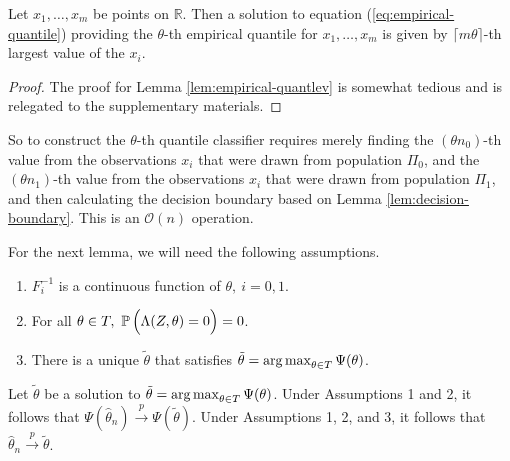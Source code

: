 \begin{lemma}
  \label{lem:empirical-quantlev}
  Let $x_1, \dots, x_m$ be points on $\mathbb{R}$.  Then a solution to equation
  (\ref{eq:empirical-quantile}) providing the $\theta$-th empirical quantile for
  $x_1, \dots, x_m$ is given by $\lceil m \theta \rceil$-th largest value of the
  $x_i$.
\end{lemma}

\begin{proof}
  The proof for Lemma \ref{lem:empirical-quantlev} is somewhat tedious and is
  relegated to the supplementary materials.
\end{proof}
So to construct the $\theta$-th quantile classifier requires merely finding the
$(\theta n_0)$-th value from the observations $x_i$ that were drawn from
population $\Pi_0$, and the $(\theta n_1)$-th value from the observations $x_i$
that were drawn from population $\Pi_1$, and then calculating the decision
boundary based on Lemma \ref{lem:decision-boundary}.  This is an
$\mathcal{O}(n)$ operation.

For the next lemma, we will need the following assumptions.
\begin{enumerate}[label=\emph{Assumption \arabic*.}, align=left]
\item $F_i^{-1}$ is a continuous function of
  $\theta,~ i=0,1$.
\item For all $\theta \in T,~ \mathbb{P}\,\Big( \Lambda(Z, \theta) = 0 \Big) = 0$.
\item There is a unique $\tilde{\theta}$ that satisfies $\tilde{\theta} =
  \operatorname*{arg\,max}_{\theta \in T} \Psi(\theta)$.
\end{enumerate}

\begin{lemma}
  \label{lem:univariate-consistency}
  Let $\tilde{\theta}$ be a solution to
  $\tilde{\theta} = \operatorname*{arg\,max}_{\theta \in T} \Psi(\theta)$.  Under Assumptions 1
  and 2, it follows that
  $\Psi(\hat{\theta}_n) \stackrel{p}{\longrightarrow} \Psi(\tilde{\theta})$.  Under
  Assumptions 1, 2, and 3, it follows that
  $\hat{\theta}_n \stackrel{p}{\longrightarrow} \tilde{\theta}$.
\end{lemma}

